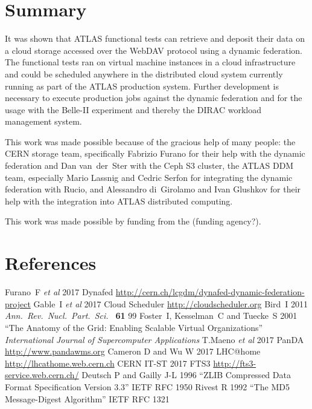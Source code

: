 \documentclass[a4paper]{jpconf}
\begin{document}
\section{Summary}
It was shown that ATLAS functional tests can retrieve and deposit their data on a cloud storage accessed over the WebDAV protocol using a dynamic federation. The functional tests ran on virtual machine instances in a cloud infrastructure and could be scheduled anywhere in the distributed cloud system currently running as part of the ATLAS production system. Further development is necessary to execute production jobs against the dynamic federation and for the usage with the Belle-II experiment and thereby the DIRAC workload management system.


\ack
This work was made possible because of the gracious help of many people: the CERN storage team, specifically Fabrizio Furano for their help with the dynamic federation and Dan van~der~Ster with the Ceph S3 cluster, the ATLAS DDM team, especially Mario Lassnig and Cedric Serfon for integrating the dynamic federation with Rucio, and Alessandro di~Girolamo and Ivan Glushkov for their help with the integration into ATLAS distributed computing.

This work was made possible by funding from the (funding agency?).


\section*{References}
\begin{thebibliography}{9}
  Furano~F {\it et al}
  2017
  Dynafed
  \url{http://cern.ch/lcgdm/dynafed-dynamic-federation-project}
  Gable~I {\it et al}
  2017
  Cloud Scheduler
  \url{http://cloudscheduler.org}
  Bird~I
  2011
  {\it Ann.\ Rev.\ Nucl.\ Part.\ Sci.\ } {\bf 61} 99
  Foster~I, Kesselman~C and Tuecke~S
  2001
  ``The Anatomy of the Grid: Enabling Scalable Virtual Organizations''
  {\it International Journal of Supercomputer Applications}
  T.Maeno {\it et al}
  2017
  PanDA
  \url{http://www.pandawms.org}
  Cameron D and Wu W
  2017
  LHC@home
  \url{http://lhcathome.web.cern.ch}
  CERN IT-ST
  2017
  FTS3
  \url{http://fts3-service.web.cern.ch/}
  Deutsch P and Gailly J-L
  1996
  ``ZLIB Compressed Data Format Specification Version 3.3''
  IETF RFC 1950
  Rivest R
  1992
  ``The MD5 Message-Digest Algorithm''
  IETF RFC 1321


\end{thebibliography}
\end{document}
